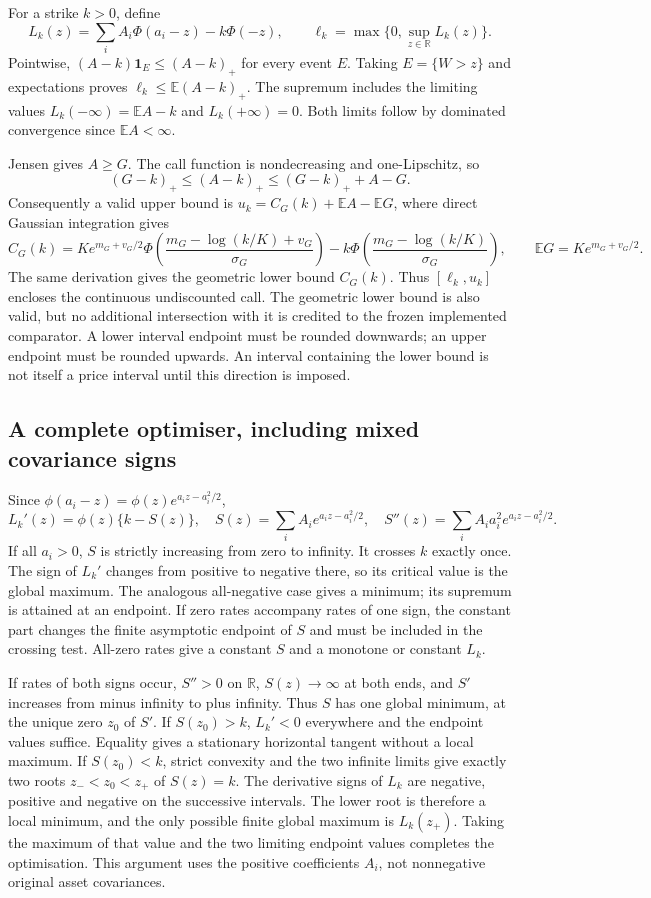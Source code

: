 For a strike $k>0$, define
\[
 L_k(z)=\sum_iA_i\Phi(a_i-z)-k\Phi(-z),\qquad
 \ell_k=\max\{0,\sup_{z\in\mathbb R}L_k(z)\}.
\]
Pointwise, $(A-k)\mathbf1_E\leq(A-k)_+$ for every event $E$.
Taking $E=\{W>z\}$ and expectations proves
$\ell_k\leq\mathbb E(A-k)_+$. The supremum includes the limiting
values $L_k(-\infty)=\mathbb E A-k$ and $L_k(+\infty)=0$.
Both limits follow by dominated convergence since $\mathbb E A<\infty$.

Jensen gives $A\geq G$. The call function is nondecreasing and
one-Lipschitz, so
\[
 (G-k)_+\leq(A-k)_+\leq(G-k)_++A-G.
\]
Consequently a valid upper bound is
$u_k=C_G(k)+\mathbb E A-\mathbb E G$, where direct Gaussian integration
gives
\[
 C_G(k)=K e^{m_G+v_G/2}
 \Phi\!\left(\frac{m_G-\log(k/K)+v_G}{\sigma_G}\right)
 -k\Phi\!\left(\frac{m_G-\log(k/K)}{\sigma_G}\right),
 \qquad \mathbb E G=K e^{m_G+v_G/2}.
\]
The same derivation gives the geometric lower bound $C_G(k)$.
Thus $[\ell_k,u_k]$ encloses the continuous undiscounted call.
The geometric lower bound is also valid, but no additional intersection
with it is credited to the frozen implemented comparator. A lower interval endpoint must be rounded downwards;
an upper endpoint must be rounded upwards. An interval containing the
lower bound is not itself a price interval until this direction is imposed.

\subsection{A complete optimiser, including mixed covariance signs}

Since $\phi(a_i-z)=\phi(z)e^{a_i z-a_i^2/2}$,
\[
 L_k'(z)=\phi(z)\{k-S(z)\},\quad
 S(z)=\sum_i A_i e^{a_i z-a_i^2/2},\quad
 S''(z)=\sum_i A_i a_i^2 e^{a_i z-a_i^2/2}.
\]
If all $a_i>0$, $S$ is strictly increasing from zero to infinity.
It crosses $k$ exactly once. The sign of $L_k'$ changes from positive to
negative there, so its critical value is the global maximum. The analogous
all-negative case gives a minimum; its supremum is attained at an endpoint.
If zero rates accompany rates of one sign, the constant part changes the
finite asymptotic endpoint of $S$ and must be included in the crossing test.
All-zero rates give a constant $S$ and a monotone or constant $L_k$.

If rates of both signs occur, $S''>0$ on $\mathbb R$,
$S(z)\to\infty$ at both ends, and $S'$ increases from minus infinity to
plus infinity. Thus $S$ has one global minimum, at the unique zero $z_0$
of $S'$. If $S(z_0)>k$, $L_k'<0$ everywhere and the endpoint values
suffice. Equality gives a stationary horizontal tangent without a local
maximum. If $S(z_0)<k$, strict convexity and the two infinite limits give
exactly two roots $z_-<z_0<z_+$ of $S(z)=k$. The derivative signs of
$L_k$ are negative, positive and negative on the successive intervals.
The lower root is therefore a local minimum, and the only possible
finite global maximum is $L_k(z_+)$. Taking the maximum of that value
and the two limiting endpoint values completes the optimisation. This
argument uses the positive coefficients $A_i$, not nonnegative original
asset covariances.

